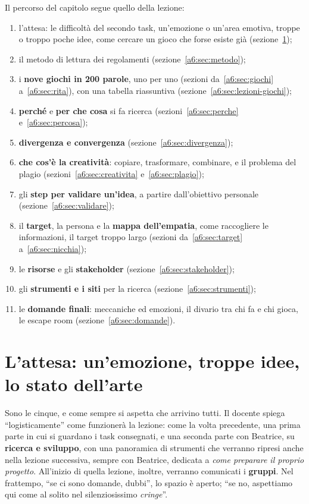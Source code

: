 Il percorso del capitolo segue quello della lezione:
\begin{enumerate}
  \item l'attesa: le difficoltà del secondo task, un'emozione o un'area emotiva,
        troppe o troppo poche idee, come cercare un gioco che forse esiste già
        (sezione~\ref{a6:sec:attesa});
  \item il metodo di lettura dei regolamenti (sezione~\ref{a6:sec:metodo});
  \item i \textbf{nove giochi in 200 parole}, uno per uno (sezioni
        da~\ref{a6:sec:giochi} a~\ref{a6:sec:rita}), con una tabella riassuntiva
        (sezione~\ref{a6:sec:lezioni-giochi});
  \item \textbf{perché} e \textbf{per che cosa} si fa ricerca
        (sezioni~\ref{a6:sec:perche} e~\ref{a6:sec:percosa});
  \item \textbf{divergenza e convergenza} (sezione~\ref{a6:sec:divergenza});
  \item \textbf{che cos'è la creatività}: copiare, trasformare, combinare, e il
        problema del plagio (sezioni~\ref{a6:sec:creativita} e~\ref{a6:sec:plagio});
  \item gli \textbf{step per validare un'idea}, a partire dall'obiettivo personale
        (sezione~\ref{a6:sec:validare});
  \item il \textbf{target}, la persona e la \textbf{mappa dell'empatia}, come
        raccogliere le informazioni, il target troppo largo
        (sezioni da~\ref{a6:sec:target} a~\ref{a6:sec:nicchia});
  \item le \textbf{risorse} e gli \textbf{stakeholder} (sezione~\ref{a6:sec:stakeholder});
  \item gli \textbf{strumenti e i siti} per la ricerca (sezione~\ref{a6:sec:strumenti});
  \item le \textbf{domande finali}: meccaniche ed emozioni, il divario tra chi fa e
        chi gioca, le escape room (sezione~\ref{a6:sec:domande}).
\end{enumerate}

\section{L'attesa: un'emozione, troppe idee, lo stato dell'arte}
\label{a6:sec:attesa}

Sono le cinque, e come sempre si aspetta che arrivino tutti. Il docente spiega
``logisticamente'' come funzionerà la lezione: come la volta precedente, una prima
parte in cui si guardano i task consegnati, e una seconda parte con Beatrice, su
\textbf{ricerca e sviluppo}, con una panoramica di strumenti che verranno ripresi
anche nella lezione successiva, sempre con Beatrice, dedicata a \emph{come preparare
il proprio progetto}. All'inizio di quella lezione, inoltre, verranno comunicati i
\textbf{gruppi}. Nel frattempo, ``se ci sono domande, dubbi'', lo spazio è aperto;
``se no, aspettiamo qui come al solito nel silenziosissimo \emph{cringe}''.

